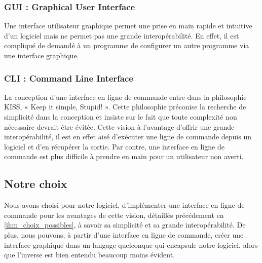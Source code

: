 		\subsubsection{GUI : \og Graphical User Interface \fg{}}
			Une interface utilisateur graphique permet une prise en main rapide et intuitive d'un logiciel mais ne permet pas une grande interopérabilité. En effet, il est compliqué de demandé à un programme de configurer un autre programme via une interface graphique.
			
		\subsubsection{CLI : \og Command Line Interface \fg{}}
			La conception d'une interface en ligne de commande entre dans la philosophie KISS, « Keep it simple, Stupid! ». Cette philosophie préconise la recherche de simplicité dans la conception et insiste sur le fait que toute complexité non nécessaire devrait être évitée. Cette vision à l'avantage d'offrir une grande interopérabilité, il est en effet aisé d'exécuter une ligne de commande depuis un logiciel et d'en récupérer la sortie. Par contre, une interface en ligne de commande est plus difficile à prendre en main pour un utilisateur non averti.  
			
	\subsection{Notre choix}
		Nous avons choisi pour notre logiciel, d'implémenter une interface en ligne de commande pour les avantages de cette vision, détaillés précédement en \ref{ihm_choix_possibles}, à savoir sa simplicité et sa grande interopérabilité. De plus, nous pouvons, à partir d'une interface en ligne de commande, créer une interface graphique dans un langage quelconque qui encapsule notre logiciel, alors que l'inverse est bien entendu beaucoup moins évident.

